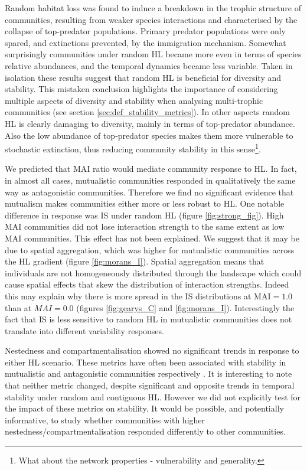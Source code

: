 Random habitat loss was found to induce a breakdown in the trophic structure of communities, resulting from weaker species interactions and characterised by the collapse of top-predator populations. Primary predator populations were only spared, and extinctions prevented, by the immigration mechanism. Somewhat surprisingly communities under random HL became more even in terms of species relative abundances, and the temporal dynamics became less variable. Taken in isolation these results suggest that random HL is beneficial for diversity and stability. This mistaken conclusion highlights the importance of considering multiple aspects of diversity and stability when analysing multi-trophic communities (see section \ref{sec:def_stability_metrics}). In other aspects random HL is clearly damaging to diversity, mainly in terms of top-predator abundance. Also the low abundance of top-predator species makes them more vulnerable to stochastic extinction, thus reducing community stability in this sense\footnote{What about the network properties - vulnerability and generality.}.

We predicted that MAI ratio would mediate community response to HL. In fact, in almost all cases, mutualistic communities responded in qualitatively the same way as antagonistic communities. Therefore we find no significant evidence that mutualism makes communities either more or less robust to HL. One notable difference in response was IS under random HL (figure \ref{fig:strong_fig}). High MAI communities did not lose interaction strength to the same extent as low MAI communities. This effect has not been explained. We suggest that it may be due to spatial aggregation, which was higher for mutualistic communities across the HL gradient (figure \ref{fig:morans_I}). Spatial aggregation means that individuals are not homogeneously distributed through the landscape which could cause spatial effects that skew the distribution of interaction strengths. Indeed this may explain why there is more spread in the IS distributions at MAI$=1.0$ than at $MAI=0.0$ (figures \ref{fig:gearys_C} and \ref{fig:morans_I}). Interestingly the fact that IS is less sensitive to random HL in mutualistic communities does not translate into different variability responses.

Nestedness and compartmentalisation showed no significant trends in response to either HL scenario. These metrics have often been associated with stability in mutualistic and antagonistic communities respectively \cite{thebault2010stability}. It is interesting to note that neither metric changed, despite significant and opposite trends in temporal stability under random and contiguous HL. However we did not explicitly test for the impact of these metrics on stability. It would be possible, and potentially informative, to study whether communities with higher nestedness/compartmentalisation responded differently to other communities.   

